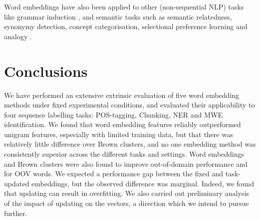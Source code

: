 \documentclass[11pt]{article}
\newcommand{\task}[1]{\textsf{#1}\xspace}
\newcommand{\pos}{\task{POS-tagging}}
\newcommand{\chunking}{\task{Chunking}}
\newcommand{\ner}{\task{NER}}
\newcommand{\mwe}{\task{MWE}}
\begin{document}
Word embeddings have also been applied to other (non-sequential NLP)
tasks like grammar induction \cite{Spitkovsky:2011}, and semantic tasks
such as semantic relatedness, synonymy detection, concept
categorisation, selectional preference learning and analogy \cite{baroni:2014}.

 
\section{Conclusions}

We have performed an extensive extrinsic evaluation of five word embedding methods
under fixed experimental conditions, and evaluated their applicability to four sequence labelling tasks: \pos, \chunking, \ner and \mwe identification.
We found that word embedding features reliably outperformed unigram
features, especially with limited training data, but that there was
relatively little difference over Brown clusters, and
no one embedding method was consistently superior across the different tasks and settings.
Word embeddings and Brown clusters were also found to improve
out-of-domain performance and for OOV words.
We expected a performance gap between the fixed and task-updated embeddings, but the observed difference was marginal.
Indeed, we found that updating can result in overfitting.
We also carried out preliminary analysis of the impact of updating on
the vectors, a direction which we intend to pursue further.

















\end{document}
